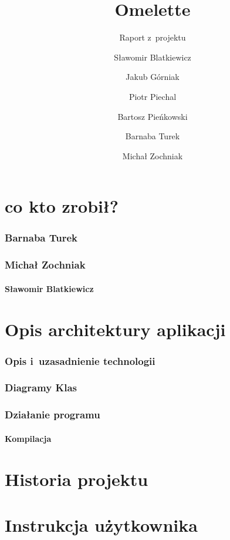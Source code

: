 \documentclass[a4paper]{scrartcl}
\begin{document}
\sloppy

\title{Omelette}
\subtitle{Raport z~projektu}
\author{
  Sławomir Blatkiewicz\and
  Jakub Górniak       \and
  Piotr Piechal       \and
  Bartosz Pieńkowski  \and
  Barnaba Turek       \and
  Michał Zochniak
}
\maketitle

\part{co kto zrobił?}
\section{Barnaba Turek}

\section{Michał Zochniak}

\subsection{Sławomir Blatkiewicz}


\part{Opis architektury aplikacji}
  \section{Opis i~uzasadnienie technologii}
    
  \section{Diagramy Klas}
    
  \section{Działanie programu}
    \subsection{Kompilacja}
      
\part{Historia projektu}
	
\part{Instrukcja użytkownika}
	
	
\end{document}
